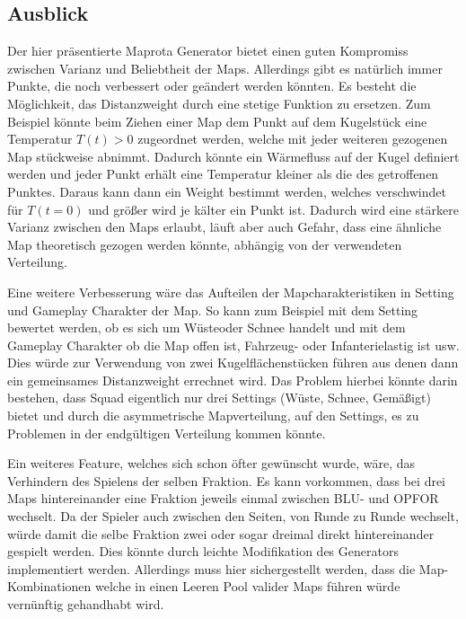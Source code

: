     \subsection{Ausblick}
        Der hier präsentierte Maprota Generator bietet einen guten Kompromiss zwischen Varianz und Beliebtheit der Maps. 
        Allerdings gibt es natürlich immer Punkte, die noch verbessert oder geändert werden könnten.
        Es besteht die Möglichkeit, das Distanzweight durch eine stetige Funktion zu ersetzen. 
        Zum Beispiel könnte beim Ziehen einer Map dem Punkt auf dem Kugelstück eine Temperatur $T(t)>0$ zugeordnet werden,
        welche mit jeder weiteren gezogenen Map stückweise abnimmt.
        Dadurch könnte ein Wärmefluss auf der Kugel definiert werden und jeder Punkt erhält eine Temperatur kleiner als die des getroffenen Punktes. 
        Daraus kann dann ein Weight bestimmt werden, 
        welches verschwindet für $T(t=0)$ und größer wird je \glqq{}kälter\grqq{} ein Punkt ist. 
        Dadurch wird eine stärkere Varianz zwischen den Maps erlaubt, 
        läuft aber auch Gefahr, dass eine ähnliche Map theoretisch gezogen werden könnte, abhängig von der verwendeten Verteilung.
        
        Eine weitere Verbesserung wäre das Aufteilen der Mapcharakteristiken in \glqq{}Setting\grqq{} und \glqq{}Gameplay\grqq{} Charakter der Map. 
        So kann zum Beispiel mit dem Setting bewertet werden, ob es sich um \glqq{}Wüste\grqq{}oder \glqq{}Schnee\grqq{} handelt 
        und mit dem Gameplay Charakter ob die Map offen ist, Fahrzeug- oder Infanterielastig ist usw. 
        Dies würde zur Verwendung von zwei Kugelflächenstücken führen aus denen dann ein gemeinsames Distanzweight errechnet wird. 
        Das Problem hierbei könnte darin bestehen, dass Squad eigentlich nur drei Settings (\glqq{}Wüste\grqq{}, \glqq{}Schnee\grqq{}, \glqq{}Gemäßigt\grqq{}) 
        bietet und durch die asymmetrische Mapverteilung, auf den Settings, es zu Problemen in der endgültigen Verteilung kommen könnte.

        Ein weiteres Feature, welches sich schon öfter gewünscht wurde, wäre, das Verhindern des \glqq{}Spielens der selben Fraktion\grqq{}.
        Es kann vorkommen, dass bei drei Maps hintereinander eine Fraktion jeweils einmal zwischen BLU- und OPFOR wechselt. 
        Da der Spieler auch zwischen den Seiten, von Runde zu Runde wechselt, würde damit die selbe Fraktion zwei oder sogar dreimal direkt hintereinander gespielt werden.
        Dies könnte durch leichte Modifikation des Generators implementiert werden. 
        Allerdings muss hier sichergestellt werden, dass die Map-Kombinationen welche in einen \glqq{}Leeren Pool valider Maps\grqq{} führen würde vernünftig gehandhabt wird.

